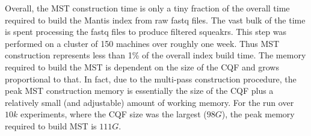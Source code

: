\begin{table}[t]
    \centering
    \vspace{0.1in}
    \caption{\label{tab:paraBenchmarks} The \mst
    construction time for $1000$ experiments using
    different number of threads.
    Memory stays the same across all the runs.}
\end{table}

Overall, the MST construction time is only a tiny fraction of the
overall time required to build the Mantis index from raw fastq files.
The vast bulk of the time is spent processing the fastq files to
produce filtered squeakrs.  This step was performed on a cluster
of 150 machines over roughly one week.  Thus MST construction
represents less than 1\% of the overall index build time. The memory required to
build the MST is dependent on the size of the CQF and grows proportional to
that. In fact, due to the multi-pass construction procedure, the peak MST
construction memory is essentially the size of the CQF plus a relatively small
(and adjustable) amount of working memory. For the run over $10k$ experiments,
where the CQF size was the largest ($98G$), the peak memory required to build MST
is $111G$.


